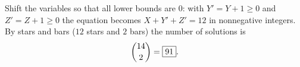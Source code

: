 Shift the variables so that all lower bounds are $0$: with $Y'=Y+1\ge0$ and $Z'=Z+1\ge0$ the equation becomes $X+Y'+Z'=12$ in nonnegative integers. By stars and bars ($12$ stars and $2$ bars) the number of solutions is
\[
\dbinom{14}{2}=\boxed{91}.
\]
